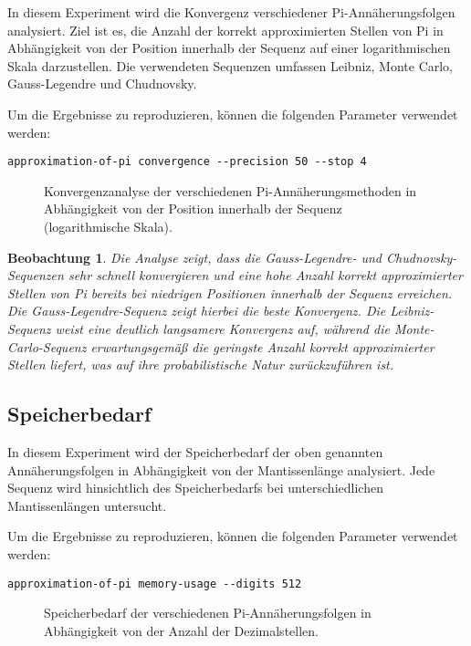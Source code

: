 \documentclass{scrartcl}
\newtheorem{approximation sequence}{Annäherungsfolge}
\newtheorem{observation}{Beobachtung}
\begin{document}
In diesem Experiment wird die Konvergenz verschiedener Pi-Annäherungsfolgen
analysiert. Ziel ist es, die Anzahl der korrekt approximierten Stellen von Pi
in Abhängigkeit von der Position innerhalb der Sequenz auf einer
logarithmischen Skala darzustellen. Die verwendeten Sequenzen umfassen Leibniz,
Monte Carlo, Gauss-Legendre und Chudnovsky.

Um die Ergebnisse zu reproduzieren, können die folgenden Parameter verwendet
werden:
\begin{verbatim}
approximation-of-pi convergence --precision 50 --stop 4
\end{verbatim}

\begin{figure}[H]
    \centering
    
    \caption{Konvergenzanalyse der verschiedenen Pi-Annäherungsmethoden in Abhängigkeit von der Position innerhalb der Sequenz (logarithmische Skala).}
    \label{fig:convergence-analysis}
\end{figure}

\begin{observation}
    Die Analyse zeigt, dass die Gauss-Legendre- und Chudnovsky-Sequenzen sehr
    schnell konvergieren und eine hohe Anzahl korrekt approximierter Stellen von Pi
    bereits bei niedrigen Positionen innerhalb der Sequenz erreichen.
    Die Gauss-Legendre-Sequenz zeigt hierbei die beste Konvergenz.
    Die Leibniz-Sequenz weist eine deutlich langsamere Konvergenz auf, während die
    Monte-Carlo-Sequenz erwartungsgemäß die geringste Anzahl korrekt approximierter
    Stellen liefert, was auf ihre probabilistische Natur zurückzuführen ist.
\end{observation}

\subsection{Speicherbedarf}

In diesem Experiment wird der Speicherbedarf der oben genannten
Annäherungsfolgen in Abhängigkeit von der Mantissenlänge analysiert. Jede
Sequenz wird hinsichtlich des Speicherbedarfs bei unterschiedlichen
Mantissenlängen untersucht.

Um die Ergebnisse zu reproduzieren, können die folgenden Parameter verwendet
werden:
\begin{verbatim}
approximation-of-pi memory-usage --digits 512
\end{verbatim}

\begin{figure}[H]
    \centering
    
    \caption{Speicherbedarf der verschiedenen Pi-Annäherungsfolgen in Abhängigkeit von der Anzahl der Dezimalstellen.}
    \label{fig:memory-usage}
\end{figure}
\end{document}
